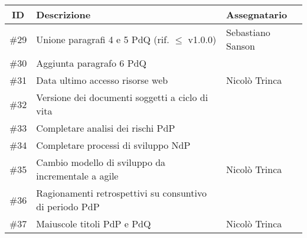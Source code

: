 \begin{center}
    \begin{tabular}{c|l|l}
        \rowcolor{pari_alt}
        \textbf{ID} & \textbf{Descrizione} & \textbf{Assegnatario} \\
        \midrule
        \#29 & Unione paragrafi 4 e 5 PdQ (rif. $\leq$ v1.0.0) & Sebastiano Sanson \\
        \#30 & Aggiunta paragrafo 6 PdQ & \\
        \#31 & Data ultimo accesso risorse web & Nicolò Trinca \\
        \#32 & Versione dei documenti soggetti a ciclo di vita & \\
        \#33 & Completare analisi dei rischi PdP & \\
        \#34 & Completare processi di sviluppo NdP & \\
        \#35 & Cambio modello di sviluppo da incrementale a agile & Nicolò Trinca \\
        \#36 & Ragionamenti retrospettivi su consuntivo di periodo PdP & \\
        \#37 & Maiuscole titoli PdP e PdQ & Nicolò Trinca \\ 
    \end{tabular}
\end{center}